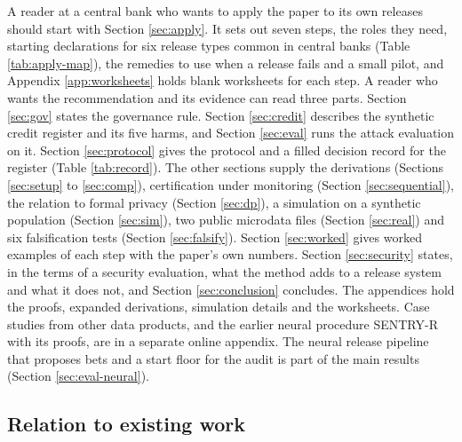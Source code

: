 \documentclass[11pt,a4paper]{article}
\theoremstyle{plain}
\theoremstyle{definition}
\theoremstyle{definition}
\theoremstyle{plain}
\begin{document}
A reader at a central bank who wants to apply the paper to its own releases
should start with Section \ref{sec:apply}. It sets out seven steps, the roles
they need, starting declarations for six release types common in central banks
(Table \ref{tab:apply-map}), the remedies to use when a release fails and a
small pilot, and Appendix \ref{app:worksheets} holds blank worksheets for each
step. A reader who wants the recommendation and its evidence can read three
parts. Section \ref{sec:gov} states the governance rule. Section
\ref{sec:credit} describes the synthetic credit register and its five harms, and
Section \ref{sec:eval} runs the attack evaluation on it. Section
\ref{sec:protocol} gives the protocol and a filled decision record for the
register (Table \ref{tab:record}). The other sections supply the derivations
(Sections \ref{sec:setup} to \ref{sec:comp}), certification under monitoring
(Section \ref{sec:sequential}), the relation to formal privacy (Section
\ref{sec:dp}), a simulation on a synthetic population (Section \ref{sec:sim}),
two public microdata files (Section \ref{sec:real}) and six falsification tests
(Section \ref{sec:falsify}). Section \ref{sec:worked} gives worked examples of each step with the
paper's own numbers. Section \ref{sec:security} states, in the terms of
a security evaluation, what the method adds to a release system and what it
does not, and Section \ref{sec:conclusion} concludes. The appendices hold the
proofs, expanded derivations, simulation details and the worksheets. Case
studies from other data products, and the earlier neural procedure SENTRY-R with its
proofs, are in a separate online appendix. The neural release pipeline that proposes
bets and a start floor for the audit is part of the main results (Section
\ref{sec:eval-neural}).

\subsection{Relation to existing work}\label{sec:lit}
\end{document}
